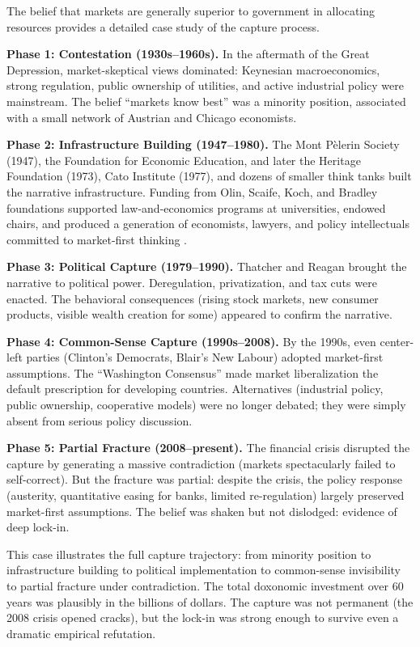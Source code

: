 The belief that markets are generally superior to government in allocating resources provides a detailed case study of the capture process.

\textbf{Phase 1: Contestation (1930s--1960s).}
In the aftermath of the Great Depression, market-skeptical views dominated: Keynesian macroeconomics, strong regulation, public ownership of utilities, and active industrial policy were mainstream.
The belief ``markets know best'' was a minority position, associated with a small network of Austrian and Chicago economists.

\textbf{Phase 2: Infrastructure Building (1947--1980).}
The Mont P\`{e}lerin Society (1947), the Foundation for Economic Education, and later the Heritage Foundation (1973), Cato Institute (1977), and dozens of smaller think tanks built the narrative infrastructure.
Funding from Olin, Scaife, Koch, and Bradley foundations supported law-and-economics programs at universities, endowed chairs, and produced a generation of economists, lawyers, and policy intellectuals committed to market-first thinking \autocite{mirowski2009, slobodian2018}.

\textbf{Phase 3: Political Capture (1979--1990).}
Thatcher and Reagan brought the narrative to political power.
Deregulation, privatization, and tax cuts were enacted.
The behavioral consequences (rising stock markets, new consumer products, visible wealth creation for some) appeared to confirm the narrative.

\textbf{Phase 4: Common-Sense Capture (1990s--2008).}
By the 1990s, even center-left parties (Clinton's Democrats, Blair's New Labour) adopted market-first assumptions.
The ``Washington Consensus'' made market liberalization the default prescription for developing countries.
Alternatives (industrial policy, public ownership, cooperative models) were no longer debated; they were simply absent from serious policy discussion.

\textbf{Phase 5: Partial Fracture (2008--present).}
The financial crisis disrupted the capture by generating a massive contradiction (markets spectacularly failed to self-correct).
But the fracture was partial: despite the crisis, the policy response (austerity, quantitative easing for banks, limited re-regulation) largely preserved market-first assumptions.
The belief was shaken but not dislodged: evidence of deep lock-in.

\begin{remark}
This case illustrates the full capture trajectory: from minority position to infrastructure building to political implementation to common-sense invisibility to partial fracture under contradiction.
The total doxonomic investment over 60 years was plausibly in the billions of dollars.
The capture was not permanent (the 2008 crisis opened cracks), but the lock-in was strong enough to survive even a dramatic empirical refutation.
\end{remark}


